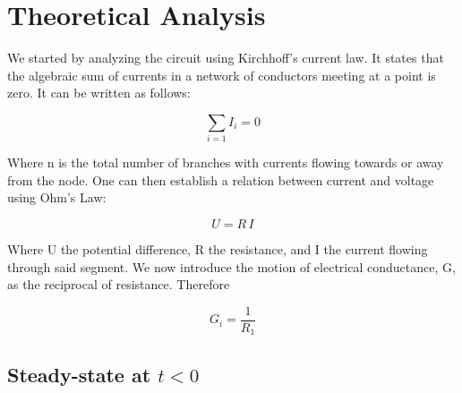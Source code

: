 \section{Theoretical Analysis}
\label{sec:analysis}


We started by analyzing the circuit using Kirchhoff's current law. It states that the algebraic sum of currents in a network of conductors meeting at a point is zero. It can be written as follows:

\begin{center}
\begin{equation}
\sum_{i=1} I_i=0
\label{current law}
\end{equation}
\end{center}
Where n is the total number of branches with currents flowing towards or away from the node.
One can then establish a relation between current and voltage using Ohm's Law:

\begin{center}
\begin{equation}
U=R\,I
\label{current law}
\end{equation}
\end{center}
Where U the potential difference, R the resistance, and I the current flowing through said segment. We now introduce the motion of electrical conductance, G, as the reciprocal of resistance. Therefore

\begin{center}
\begin{equation}
G_i=\frac{1}{R_1}
\label{current law}
\end{equation}
\end{center}

\subsection{Steady-state at $t<0$}

